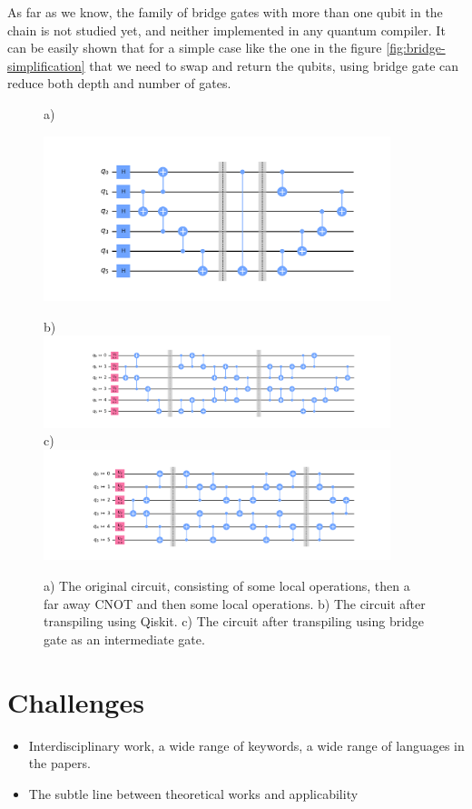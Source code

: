 \documentclass{article}
\begin{document}
  As far as we know, the family of bridge gates with more than one qubit in the chain is not studied yet, and neither implemented in any quantum compiler. 
  It can be easily shown that for a simple case like the one in the figure \ref{fig:bridge-simplification} that we need to swap and return the qubits, using bridge gate can reduce both depth and number of gates. 

  \begin{figure}
    a) \\
    \begin{center}
    \includegraphics[width=0.9\textwidth]{../../code/expm_1_bridge/out/original_circuit}
    \end{center}
    b) \\
    \includegraphics[width=0.9\textwidth]{../../code/expm_1_bridge/out/transpiled_circuit_swap} \\
    c) \\
    \includegraphics[width=0.9\textwidth]{../../code/expm_1_bridge/out/transpiled_circuit_bridge}
    \caption{a) The original circuit, consisting of some local operations, then a far away CNOT and then some local operations. b) The circuit after transpiling using Qiskit. c) The circuit after transpiling using bridge gate as an intermediate gate.}
  \end{figure}

\section{Challenges}

\begin{itemize}
\item Interdisciplinary work, a wide range of keywords, a wide range of languages in the papers.

\item The subtle line between theoretical works and applicability
\end{itemize}
\end{document}
